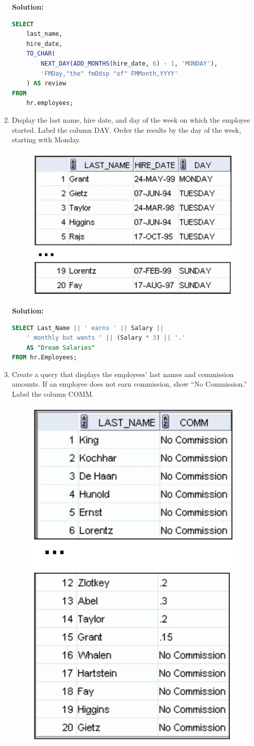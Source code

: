 \documentclass[a4paper,12pt]{article}
\begin{document}
\begin{enumerate}
    \textbf{Solution: }
    \begin{lstlisting}[language=SQL]
SELECT 
    last_name,
    hire_date,
    TO_CHAR(
        NEXT_DAY(ADD_MONTHS(hire_date, 6) - 1, 'MONDAY'),
        'FMDay,"the" fmDdsp "of" FMMonth,YYYY'
    ) AS review
FROM 
    hr.employees;
    \end{lstlisting}
    \item Display the last name, hire date, and day of the week on which the employee started. Label the
column DAY. Order the results by the day of the week, starting with Monday.
    \begin{figure}[h]
        \centering
            \centering
            \includegraphics[width=.5\linewidth]{graphics/43.png}
    \end{figure}
    
    \textbf{Solution: }
    \begin{lstlisting}[language=SQL]
SELECT Last_Name || ' earns ' || Salary || 
    ' monthly but wants ' || (Salary * 3) || '.' 
    AS "Dream Salaries"
FROM hr.Employees;
    \end{lstlisting}
        \item Create a query that displays the employees' last names and commission amounts. If an employee
does not earn commission, show “No Commission.” Label the column COMM.
    \begin{figure}[h]
        \centering
            \centering
            \includegraphics[width=.4\linewidth]{graphics/44.png}
    \end{figure}
    

\end{enumerate}
\end{document}
